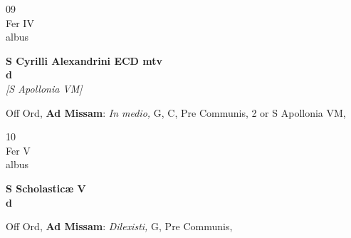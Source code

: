 \documentclass[10pt, openany]{book}
\begin{document}
        \begin{center}
            \begin{minipage}{3.5in}
                \vspace{2em}
                \begin{minipage}{0.5in}
                    {\Huge 09} \\
                    {\normalsize Fer IV} \\
                    {\normalsize albus}
                \end{minipage}
                \begin{minipage}{3.0in}
                    \textbf{ \large S Cyrilli Alexandrini ECD mtv \\
                    \textnormal{\normalsize d}} \\ \textit{[S Apollonia VM]} \\ 
                \end{minipage}
                \begin{justify}Off Ord, \textbf{Ad Missam}: \textit{In medio,} G, C, Pre Communis, 2 or S Apollonia VM,  
                \end{justify}
            \end{minipage}
        \end{center}
    
        \begin{center}
            \begin{minipage}{3.5in}
                \vspace{2em}
                \begin{minipage}{0.5in}
                    {\Huge 10} \\
                    {\normalsize Fer V} \\
                    {\normalsize albus}
                \end{minipage}
                \begin{minipage}{3.0in}
                    \textbf{ \large S Scholasticæ V \\
                    \textnormal{\normalsize d}} \\ 
                \end{minipage}
                \begin{justify}Off Ord, \textbf{Ad Missam}: \textit{Dilexisti,} G, Pre Communis,  
                \end{justify}
            \end{minipage}
        \end{center}
    
\end{document}

